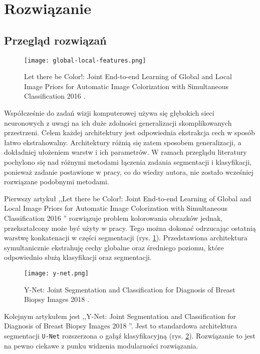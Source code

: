 \newpage %
\section{Rozwiązanie}
\subsection{Przegląd rozwiązań}

\begin{figure}[ht!]
    \texttt{[image: global-local-features.png]}
    \caption{Let there be Color!: Joint End-to-end Learning of Global and Local Image Priors for Automatic Image Colorization with Simultaneous Classification 2016 \cite{iizuka2016let}.}
    \label{fig:parrarel-arch}
\end{figure}

Współcześnie do zadań wizji komputerowej używa się głębokich sieci neuronowych z uwagi na ich duże zdolności generalizacji skomplikowanych przestrzeni. Celem każdej architektury jest odpowiednia ekstrakcja cech w sposób łatwo ekstrahowalny. Architektury różnią się zatem sposobem generalizacji, a dokładniej ułożeniem warstw i ich parametrów. W ramach przeglądu literatury pochylono się nad różnymi metodami łączenia zadania segmentacji i klasyfikacji, ponieważ zadanie postawione w pracy, co do wiedzy autora, nie zostało wcześniej rozwiązane podobnymi metodami.

Pierwszy artykuł ,,Let there be Color!: Joint End-to-end Learning of Global and Local Image Priors for Automatic Image Colorization with Simultaneous Classification 2016 \cite{iizuka2016let}'' rozwiązuje problem kolorowania obrazków jednak, przekształcony może być użyty w pracy. Tego można dokonać odrzucając ostatnią warstwę konkatenacji w części segmentacji (rys. \ref{fig:parrarel-arch}). Przedstawiona architektura symultanicznie ekstrahuję cechy globalne oraz średniego poziomu, które odpowiednio służą klasyfikacji oraz segmentacji.

\begin{figure}[ht!]
    \texttt{[image: y-net.png]}
    \caption{Y-Net: Joint Segmentation and Classification for Diagnosis of Breast Biopsy Images 2018 \cite{mehta2018net}.}
    \label{fig:y-net}
\end{figure}

Kolejnym artykułem jest ,,Y-Net: Joint Segmentation and Classification for Diagnosis of Breast Biopsy Images 2018 \cite{mehta2018net}''. Jest to standardowa architektura segmentacji \texttt{U-Net} rozszerzona o gałąź klasyfikacyjną (rys. \ref{fig:y-net}). Rozwiązanie to jest na pewno ciekawe z punku widzenia modularności rozwiązania.

